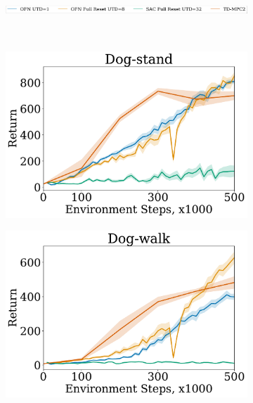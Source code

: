 \begin{figure}[t]
\centering
    \begin{subfigure}[b]{0.8\textwidth}
        \centering
        \includegraphics[height=0.4cm]{figures/dissecting/dog_exp/dog_legend.pdf}
    \end{subfigure}\\%
    \begin{subfigure}[t]{0.25\textwidth}
        \centering
        \includegraphics[width=\textwidth]{figures/dissecting/dog_exp/dog-stand.pdf}
    \end{subfigure}%
    \begin{subfigure}[t]{0.25\textwidth}
        \centering
        \includegraphics[width=\textwidth]{figures/dissecting/dog_exp/dog-walk.pdf}

\end{subfigure}
\end{figure}
